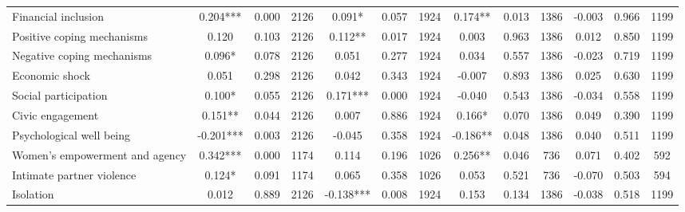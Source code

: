 \begin{tabular}{l*{12}{c}}
 Financial inclusion &        0.204*** &        0.000 & 2126    &        0.091* &        0.057 & 1924    &        0.174** &        0.013 & 1386 &       -0.003 &        0.966 & 1199 \\ 

 Positive coping mechanisms &        0.120 &        0.103 & 2126    &        0.112** &        0.017 & 1924    &        0.003 &        0.963 & 1386 &        0.012 &        0.850 & 1199 \\ 

 Negative coping mechanisms &        0.096* &        0.078 & 2126    &        0.051 &        0.277 & 1924    &        0.034 &        0.557 & 1386 &       -0.023 &        0.719 & 1199 \\ 

 Economic shock &        0.051 &        0.298 & 2126    &        0.042 &        0.343 & 1924    &       -0.007 &        0.893 & 1386 &        0.025 &        0.630 & 1199 \\ 

 Social participation &        0.100* &        0.055 & 2126    &        0.171*** &        0.000 & 1924    &       -0.040 &        0.543 & 1386 &       -0.034 &        0.558 & 1199 \\ 

 Civic engagement &        0.151** &        0.044 & 2126    &        0.007 &        0.886 & 1924    &        0.166* &        0.070 & 1386 &        0.049 &        0.390 & 1199 \\ 

 Psychological well being &       -0.201*** &        0.003 & 2126    &       -0.045 &        0.358 & 1924    &       -0.186** &        0.048 & 1386 &        0.040 &        0.511 & 1199 \\ 

 Women's empowerment and agency &        0.342*** &        0.000 & 1174    &        0.114 &        0.196 & 1026    &        0.256** &        0.046 & 736 &        0.071 &        0.402 & 592 \\ 

 Intimate partner violence &        0.124* &        0.091 & 1174    &        0.065 &        0.358 & 1026    &        0.053 &        0.521 & 736 &       -0.070 &        0.503 & 594 \\ 

 Isolation &        0.012 &        0.889 & 2126    &       -0.138*** &        0.008 & 1924    &        0.153 &        0.134 & 1386 &       -0.038 &        0.518 & 1199 \\ 


\end{tabular}

